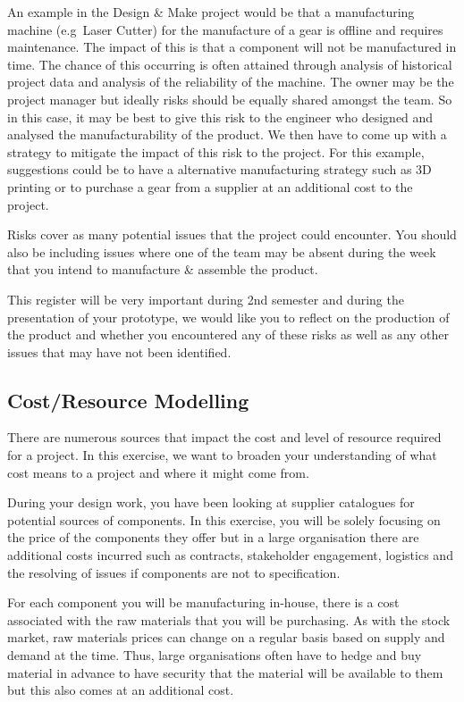 An example in the Design \& Make project would be that a manufacturing machine (e.g\ Laser Cutter) for the manufacture of a gear is offline and requires maintenance. The impact of this is that a component will not be manufactured in time. The chance of this occurring is often attained through analysis of historical project data and analysis of the reliability of the machine. The owner may be the project manager but ideally risks should be equally shared amongst the team. So in this case, it may be best to give this risk to the engineer who designed and analysed the manufacturability of the product. We then have to come up with a strategy to mitigate the impact of this risk to the project. For this example, suggestions could be to have a alternative manufacturing strategy such as 3D printing or to purchase a gear from a supplier at an additional cost to the project.

Risks cover as many potential issues that the project could encounter. You should also be including issues where one of the team may be absent during the week that you intend to manufacture \& assemble the product.

This register will be very important during 2nd semester and during the presentation of your prototype, we would like you to reflect on the production of the product and whether you encountered any of these risks as well as any other issues that may have not been identified.

\subsection{Cost/Resource Modelling}

There are numerous sources that impact the cost and level of resource required for a project. In this exercise, we want to broaden your understanding of what cost means to a project and where it might come from.

During your design work, you have been looking at supplier catalogues for potential sources of components. In this exercise, you will be solely focusing on the price of the components they offer but in a large organisation there are additional costs incurred such as contracts, stakeholder engagement, logistics and the resolving of issues if components are not to specification. 

For each component you will be manufacturing in-house, there is a cost associated with the raw materials that you will be purchasing. As with the stock market, raw materials prices can change on a regular basis based on supply and demand at the time. Thus, large organisations often have to hedge and buy material in advance to have security that the material will be available to them but this also comes at an additional cost.

